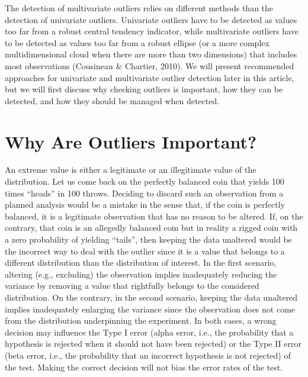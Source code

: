 \documentclass[man,floatsintext]{apa6}
\begin{document}
The detection of multivariate outliers relies on different methods than the detection of univariate outliers. Univariate outliers have to be detected as values too far from a robust central tendency indicator, while multivariate outliers have to be detected as values too far from a robust ellipse (or a more complex multidimensional cloud when there are more than two dimensions) that includes most observations (Cousineau \& Chartier, 2010). We will present recommended approaches for univariate and multivariate outlier detection later in this article, but we will first discuss why checking outliers is important, how they can be detected, and how they should be managed when detected.

\hypertarget{why-are-outliers-important}{%
\section{Why Are Outliers Important?}\label{why-are-outliers-important}}

An extreme value is either a legitimate or an illegitimate value of the distribution. Let us come back on the perfectly balanced coin that yields 100 times \enquote{heads} in 100 throws. Deciding to discard such an observation from a planned analysis would be a mistake in the sense that, if the coin is perfectly balanced, it is a legitimate observation that has no reason to be altered. If, on the contrary, that coin is an allegedly balanced coin but in reality a rigged coin with a zero probability of yielding \enquote{tails}, then keeping the data unaltered would be the incorrect way to deal with the outlier since it is a value that belongs to a different distribution than the distribution of interest. In the first scenario, altering (e.g., excluding) the observation implies inadequately reducing the variance by removing a value that rightfully belongs to the considered distribution. On the contrary, in the second scenario, keeping the data unaltered implies inadequately enlarging the variance since the observation does not come from the distribution underpinning the experiment. In both cases, a wrong decision may influence the Type I error (alpha error, i.e., the probability that a hypothesis is rejected when it should not have been rejected) or the Type II error (beta error, i.e., the probability that an incorrect hypothesis is not rejected) of the test. Making the correct decision will not bias the error rates of the test.
\end{document}
